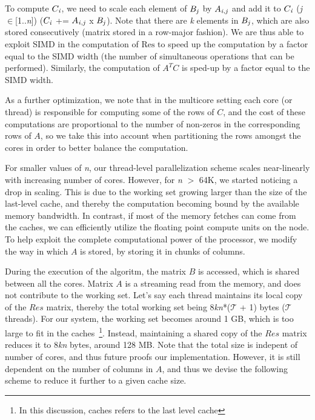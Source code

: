 To compute $C_{\it{i}}$, we need to scale each element of $B_{{\it{j}}}$ by
$A_{{\it{i}},{\it{j}}}$ and add it to $C_{\it{i}}$ ({\it{j}}$\in$[1..{\it{n}}])
($C_{\it{i}}$ += $A_{{\it{i}},{\it{j}}}$ x $B_{{\it{j}}}$). Note that there are
{\it{k}} elements in $B_{{\it{j}}}$, which are also stored consecutively
(matrix stored in a row-major fashion).  We are thus able to exploit SIMD in the
computation of $\mathrm{Res}$ to speed up the computation by a factor equal to
the SIMD width (the number of simultaneous operations that can be performed).
Similarly, the computation of $A^TC$ is sped-up by a factor equal to the SIMD width.

As a further optimization, we note that in the multicore setting each core (or thread) is responsible for computing some 
of the rows of $C$, and the cost of these computations are proportional to the number of non-zeros
in the corresponding rows of $A$, so we take this into account when partitioning the rows
amongst the cores in order to better balance the computation. 

For smaller values of {\it{n}}, our thread-level parallelization scheme scales
near-linearly with increasing number of cores. However, for {\it{n}} $>$ 64K,
we started noticing a drop in scaling. This is due to the working set growing
larger than the size of the last-level cache, and thereby the computation
becoming bound by the available memory bandwidth. In contrast, if most of the
memory fetches can come from the caches, we can efficiently utilize the
floating point compute units on the node. To help exploit the complete
computational power of the processor, we modify the way in which $A$ is stored,
by storing it in chunks of columns. 

     During the execution of the algoritm, the matrix $B$ is
     accessed, which is shared between all the cores. Matrix $A$ is a
     streaming read from the memory, and does not contribute to
     the working set. Let's say each thread maintains  its local copy
     of the $Res$ matrix, thereby the total working set being
     8{\it{kn}}*($\mathcal{T}$ + 1) bytes ($\mathcal{T}$ threads). For
     our system,  
     the working set becomes
     around 1 GB, which is too large to fit in the
     caches~\footnote{In this discussion, caches refers to the last
     level cache}. Instead,
     maintaining a shared copy of the $Res$ matrix reduces it to
     8{\it{kn}} bytes, around 128 MB. Note that the
     total size is indepent of number of cores, and thus future
     proofs our implementation.
     However, it is still dependent on  the
     number of columns in $A$, and thus we devise the
     following scheme to reduce it further to a given cache size.


